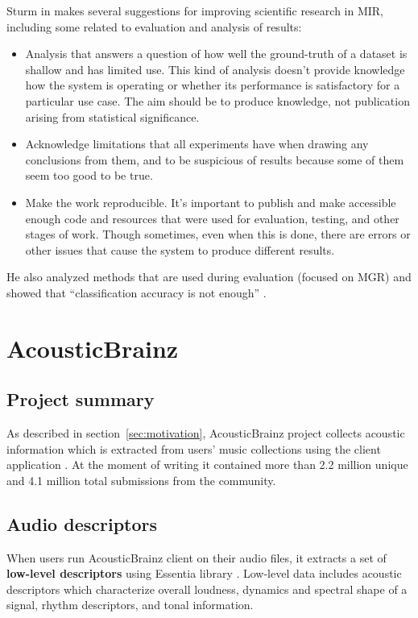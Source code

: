 Sturm in \cite{sturmfuture} makes several suggestions for improving scientific research in MIR, including some related to evaluation and analysis of results:
\begin{itemize}
    \item Analysis that answers a question of how well the ground-truth of a dataset is shallow and has limited use. This kind of analysis doesn't provide knowledge how the system is operating or whether its performance is satisfactory for a particular use case. The aim should be to produce knowledge, not publication arising from statistical significance.
    \item Acknowledge limitations that all experiments have when drawing any conclusions from them, and to be suspicious of results because some of them seem too good to be true.
    \item Make the work reproducible. It's important to publish and make accessible enough code and resources that were used for evaluation, testing, and other stages of work. Though sometimes, even when this is done, there are errors or other issues that cause the system to produce different results.
\end{itemize}
He also analyzed methods that are used during evaluation (focused on MGR) and showed that ``classification accuracy is not enough'' \cite{sturm2013}.

\section{AcousticBrainz}
\label{sec:soa:acousitcbrainz}

\subsection{Project summary}

As described in section~\ref{sec:motivation}, AcousticBrainz project collects acoustic information which is extracted from users' music collections using the client application \cite{porter2015acousticbrainz}. At the moment of writing it contained more than 2.2 million unique and 4.1 million total submissions from the community.

\subsection{Audio descriptors}

When users run AcousticBrainz client on their audio files, it extracts a set of \textbf{low-level descriptors} using Essentia library \cite{essentia}. Low-level data includes acoustic descriptors which characterize overall loudness, dynamics and spectral shape of a signal, rhythm descriptors, and tonal information.

